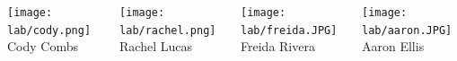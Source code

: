 \begin{frame}[c]{}
\begin{columns}[t]
\begin{column}[T]{3.5in}
\begin{columns}[t]
				
			\end{columns}
			
			\vspace{.1in}
			
			\begin{columns}[t]
				
				\begin{column}[T]{1in}
					{\centering
						\texttt{[image: lab/cody.png]} \\
						\vspace{-.1in}
						{\tiny Cody Combs} \\
						\par
					}
				\end{column}
			
			
				\begin{column}[T]{1in}
					{\centering
						\texttt{[image: lab/rachel.png]} \\
						\vspace{-.1in}
						{\tiny Rachel Lucas} \\
						\par
					}
				\end{column}
			
				\begin{column}[T]{1in}
					{\centering
						\texttt{[image: lab/freida.JPG]} \\
						\vspace{-.1in}
						{\tiny Freida Rivera} \\
						\par
					}
				\end{column}
			
				\begin{column}[T]{1in}
					{\centering
						\texttt{[image: lab/aaron.JPG]} \\
						\vspace{-.1in}
						{\tiny Aaron Ellis} \\
						\par
					}
				\end{column}
				
				
			\end{columns}
		\end{column}


	\end{columns}

	
	
\end{frame}



